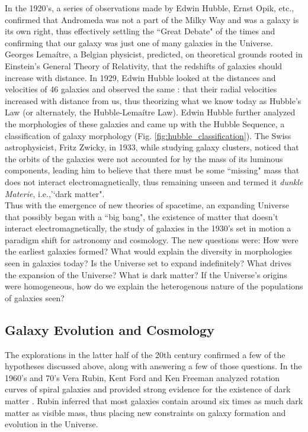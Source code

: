 In the 1920's, a series of observations made by Edwin Hubble, Ernst Opik, etc., confirmed that Andromeda was not a part of the Milky Way and was a galaxy is its own right, thus effectively settling the ``Great Debate" of the times and confirming that our galaxy was just one of many galaxies in the Universe. Georges Lema{\'i}tre, a Belgian physicist, predicted, on theoretical grounds rooted in Einstein's General Theory of Relativity, that the redshifts of galaxies should increase with distance. In 1929, Edwin Hubble looked at the distances and velocities of 46 galaxies and observed the same \citep{1929PNAS...15..168H}: that their radial velocities increased with distance from us, thus theorizing what we know today as Hubble's Law (or alternately, the Hubble-Lema{\'i}tre Law). Edwin Hubble further analyzed the morphologies of these galaxies and came up with the Hubble Sequence, a classification of galaxy morphology (Fig. \ref{fig:hubble_classification}). The Swiss astrophysicist, Fritz Zwicky, in 1933, while studying galaxy clusters, noticed that the orbits of the galaxies were not accounted for by the mass of its luminous components, leading him to believe that there must be some ``missing" mass \citep{1937ApJ....86..217Z} that does not interact electromagnetically, thus remaining unseen and termed it \emph{dunkle Materie}, i.e.,'`dark matter".\\

Thus with the emergence of new theories of spacetime, an expanding Universe that possibly began with a ``big bang", the existence of matter that doesn't interact electromagnetically, the study of galaxies in the 1930's set in motion a paradigm shift for astronomy and cosmology. The new questions were: How were the earliest galaxies formed? What would explain the diversity in morphologies seen in galaxies today? Is the Universe set to expand indefinitely? What drives the expansion of the Universe? What is dark matter? If the Universe's origins were homogeneous, how do we explain the heterogenous nature of the populations of galaxies seen?\\

\subsection{Galaxy Evolution and Cosmology}

The explorations in the latter half of the 20th century confirmed a few of the hypotheses discussed above, along with answering a few of those questions. In the 1960's and 70's Vera Rubin, Kent Ford and Ken Freeman analyzed rotation curves of spiral galaxies and provided strong evidence for the existence of dark matter \citep{freeman_disks_1970-1}. Rubin inferred that most galaxies contain around six times as much dark matter as visible mass\citep{rubin_rotational_1980}, thus placing new constraints on galaxy formation and evolution in the Universe.\\

